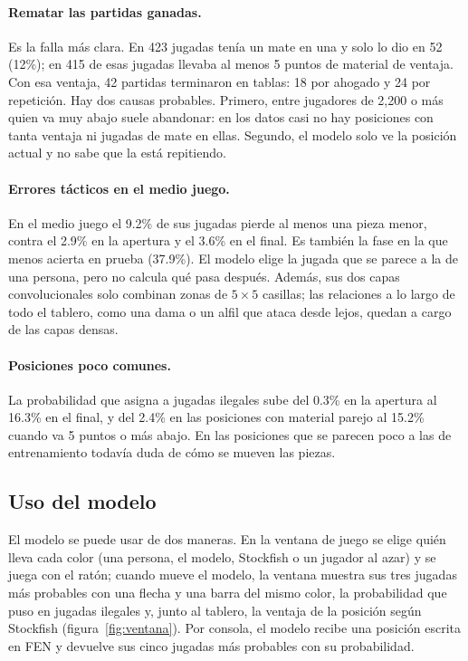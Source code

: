 \documentclass[a4paper,12pt,twocolumn]{article}
\begin{document}
\paragraph{Rematar las partidas ganadas.} Es la falla más clara. En 423 jugadas tenía un mate en una y solo lo dio en 52 (12\%); en 415 de esas jugadas llevaba al menos 5 puntos de material de ventaja. Con esa ventaja, 42 partidas terminaron en tablas: 18 por ahogado y 24 por repetición. Hay dos causas probables. Primero, entre jugadores de 2,200 o más quien va muy abajo suele abandonar: en los datos casi no hay posiciones con tanta ventaja ni jugadas de mate en ellas. Segundo, el modelo solo ve la posición actual y no sabe que la está repitiendo.
\paragraph{Errores tácticos en el medio juego.} En el medio juego el 9.2\% de sus jugadas pierde al menos una pieza menor, contra el 2.9\% en la apertura y el 3.6\% en el final. Es también la fase en la que menos acierta en prueba (37.9\%). El modelo elige la jugada que se parece a la de una persona, pero no calcula qué pasa después. Además, sus dos capas convolucionales solo combinan zonas de $5\times5$ casillas; las relaciones a lo largo de todo el tablero, como una dama o un alfil que ataca desde lejos, quedan a cargo de las capas densas.
\paragraph{Posiciones poco comunes.} La probabilidad que asigna a jugadas ilegales sube del 0.3\% en la apertura al 16.3\% en el final, y del 2.4\% en las posiciones con material parejo al 15.2\% cuando va 5 puntos o más abajo. En las posiciones que se parecen poco a las de entrenamiento todavía duda de cómo se mueven las piezas.
\subsection{Uso del modelo}

El modelo se puede usar de dos maneras. En la ventana de juego se elige quién lleva cada color (una persona, el modelo, Stockfish o un jugador al azar) y se juega con el ratón; cuando mueve el modelo, la ventana muestra sus tres jugadas más probables con una flecha y una barra del mismo color, la probabilidad que puso en jugadas ilegales y, junto al tablero, la ventaja de la posición según Stockfish (figura~\ref{fig:ventana}). Por consola, el modelo recibe una posición escrita en FEN y devuelve sus cinco jugadas más probables con su probabilidad.
\end{document}
